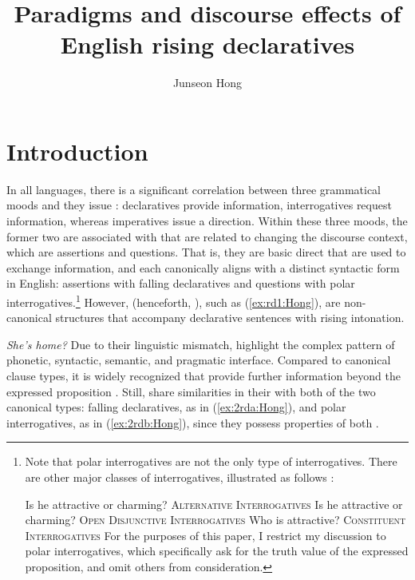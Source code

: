 \documentclass[output=paper,colorlinks,citecolor=brown]{langscibook}
\author{Junseon Hong\orcid{https://orcid.org/0009-0004-4543-1952}\affiliation{Stanford University}}
\title{Paradigms and discourse effects of English rising declaratives}
\begin{document}
\maketitle

\section{Introduction}
\label{sec:intro:Hong}

In all languages, there is a significant correlation between three grammatical moods and  they issue \citep{roberts2018speech}: declaratives provide information, interrogatives request information, whereas imperatives issue a direction. Within these three moods, the former two are associated with  that are related to changing the discourse context, which are assertions and questions. That is, they are basic direct  that are used to exchange information, and each canonically aligns with a distinct syntactic form in English: assertions with falling declaratives and questions with polar interrogatives.\footnote{Note that polar interrogatives are not the only type of interrogatives. There are other major classes of interrogatives, illustrated as follows \citep{ciardelli2018inquisitive}:

\ea
    \ea Is he attractive\textsuperscript{\uparrow} or charming\textsuperscript{\downarrow}? \hfill \textsc{Alternative Interrogatives}
    \ex Is he attractive\textsuperscript{\uparrow} or charming\textsuperscript{\uparrow}? \hfill \textsc{Open Disjunctive Interrogatives}
    \ex Who is attractive? \hfill \textsc{Constituent Interrogatives}
    \z
\z
For the purposes of this paper, I restrict my discussion to polar interrogatives, which specifically ask for the truth value of the expressed proposition, and omit others from consideration.}
However,  (henceforth, ), such as (\ref{ex:rd1:Hong}), are non-canonical structures that accompany declarative sentences with rising intonation.

\label{sec:examples:Hong}
\ea \label{ex:rd1:Hong}
 \textit{She's home?}
\z
Due to their linguistic mismatch,  highlight the complex pattern of phonetic, syntactic, semantic, and pragmatic interface. Compared to canonical clause types, it is widely recognized that  provide further information beyond the expressed proposition \citep[e.g.,][]{gunlogson2003true, gunlogson2008question, malamud2015three, farkas2017division, jeong2018intonation, rudin2022intonational}. Still,  share similarities in their  with both of the two canonical types: falling declaratives, as in (\ref{ex:2rda:Hong}), and polar interrogatives, as in (\ref{ex:2rdb:Hong}), since they possess properties of both \citep{jeong2018intonation}.
\end{document}
